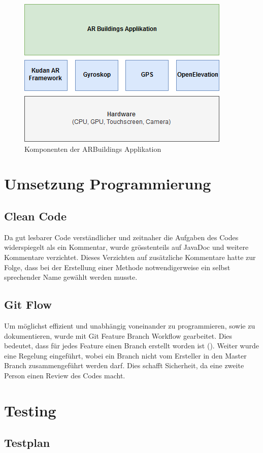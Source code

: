 \documentclass[a4paper]{scrreprt}
\begin{document}
\begin{figure}[h!]
	\centering
	\includegraphics[width=0.7\linewidth, keepaspectratio]{Komponentendesign}
	\caption{Komponenten der ARBuildings Applikation}
	\label{fig:Komponentendesign}
\end{figure}

\section{Umsetzung Programmierung}
\subsection{Clean Code}
Da gut lesbarer Code verständlicher und zeitnaher die Aufgaben des Codes widerspiegelt als ein Kommentar, wurde grösstenteils auf JavaDoc und weitere Kommentare verzichtet. Dieses Verzichten auf zusätzliche Kommentare hatte zur Folge, dass bei der Erstellung einer Methode notwendigerweise ein selbst sprechender Name gewählt werden musste. 
\subsection{Git Flow}
Um möglichst effizient und unabhängig voneinander zu programmieren, sowie zu dokumentieren, wurde mit Git Feature Branch Workflow gearbeitet. Dies bedeutet, dass für jedes Feature einen Branch erstellt worden ist (\cite{gitFeatureBranchWorkflow}). Weiter wurde eine Regelung eingeführt, wobei ein Branch nicht vom Ersteller in den Master Branch zusammengeführt werden darf. Dies schafft Sicherheit, da eine zweite Person einen Review des Codes macht.
\section{Testing}

\subsection{Testplan}
\end{document}
